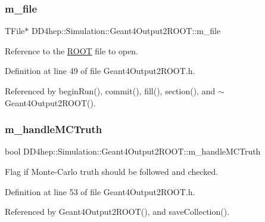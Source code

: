 \subsubsection{\texorpdfstring{m\+\_\+file}{m\_file}}
{\footnotesize\ttfamily T\+File$\ast$ D\+D4hep\+::\+Simulation\+::\+Geant4\+Output2\+R\+O\+O\+T\+::m\+\_\+file\hspace{0.3cm}{\ttfamily [protected]}}



Reference to the \hyperlink{namespace_r_o_o_t}{R\+O\+OT} file to open. 



Definition at line 49 of file Geant4\+Output2\+R\+O\+O\+T.\+h.



Referenced by begin\+Run(), commit(), fill(), section(), and $\sim$\+Geant4\+Output2\+R\+O\+O\+T().

\hypertarget{class_d_d4hep_1_1_simulation_1_1_geant4_output2_r_o_o_t_a3c70e98cb0a96de60a51443482a88c9f}{}\label{class_d_d4hep_1_1_simulation_1_1_geant4_output2_r_o_o_t_a3c70e98cb0a96de60a51443482a88c9f} 
\subsubsection{\texorpdfstring{m\+\_\+handle\+M\+C\+Truth}{m\_handleMCTruth}}
{\footnotesize\ttfamily bool D\+D4hep\+::\+Simulation\+::\+Geant4\+Output2\+R\+O\+O\+T\+::m\+\_\+handle\+M\+C\+Truth\hspace{0.3cm}{\ttfamily [protected]}}



Flag if Monte-\/\+Carlo truth should be followed and checked. 



Definition at line 53 of file Geant4\+Output2\+R\+O\+O\+T.\+h.



Referenced by Geant4\+Output2\+R\+O\+O\+T(), and save\+Collection().

\hypertarget{class_d_d4hep_1_1_simulation_1_1_geant4_output2_r_o_o_t_a27d44319d71af2cbb9304f94fce6a075}{}\label{class_d_d4hep_1_1_simulation_1_1_geant4_output2_r_o_o_t_a27d44319d71af2cbb9304f94fce6a075} 
